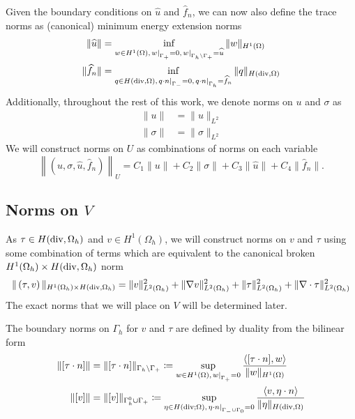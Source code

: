 \documentclass[11pt,onecolumn]{scrartcl}
\newcommand{\grad}{\nabla}
\renewcommand{\div}{\grad \cdot}
\begin{document}
Given the boundary conditions on $\widehat{u}$ and $\widehat{f}_n$, we can now also define the trace norms as (canonical) minimum energy extension norms 
\begin{align*}
\|\widehat{u}\| &= \inf_{w\in H^1(\Omega), \left.w\right|_{\Gamma_+}=0, \left.w\right |_{\Gamma_h\setminus \Gamma_+ } = \widehat{u}} \|w\|_{H^1(\Omega)}\\
\|\widehat{f}_n\| &= \inf_{q\in H({\rm div},\Omega), \left.q\cdot n\right|_{\Gamma_-}= 0, \left. q\cdot n \right |_{\Gamma_h} = \widehat{f}_n} \|q\|_{H({\rm div},\Omega)}
\end{align*}
Additionally, throughout the rest of this work, we denote norms on $u$ and $\sigma$ as
\begin{align*}
\|u\| &= \|u\|_{L^2} \\
\|\sigma\| &= \|\sigma\|_{L^2}
\end{align*}
We will construct norms on $U$ as combinations of norms on each variable
\[
\left\|\left(u,\sigma,\widehat{u},\widehat{f}_n\right)\right\|_U = C_1 \|u\| + C_2 \|\sigma\| + C_3 \|\widehat{u}\| + C_4 \|\widehat{f}_n\|.
\]
\subsection{Norms on $V$}

As $\tau \in H({\rm div},\Omega_h)$ and $v \in H^1(\Omega_h)$, we will construct norms on $v$ and $\tau$ using some combination of terms which are equivalent to the canonical broken $H^1(\Omega_h) \times H({\rm div},\Omega_h)$ norm 
\[
\|\left(\tau,v\right)\|_{H^1(\Omega_h) \times H({\rm div},\Omega_h)} = \|v\|_{L^2(\Omega_h)}^2 + \|\grad v\|_{L^2(\Omega_h)}^2  + \|\tau\|_{L^2(\Omega_h)}^2 + \|\div \tau\|_{L^2(\Omega_h)}^2
\]
The exact norms that we will place on $V$ will be determined later. 

The boundary norms on $\Gamma_h$ for $v$ and $\tau$ are defined by duality from the bilinear form
\begin{align*}
\|[\tau\cdot n]\| &= \|[\tau\cdot n]\|_{\Gamma_h \setminus \Gamma_+} \coloneqq \sup_{w\in H^1(\Omega), \left.w\right|_{\Gamma_+} = 0} \frac{\langle [\tau \cdot n], w\rangle}{\|w\|_{H^1(\Omega)}}\\
\|[v]\|&=\|[v]\|_{\Gamma_h^0 \cup \Gamma_+} \coloneqq \sup_{\eta\in H({\rm div};\Omega), \left.\eta\cdot n\right|_{\Gamma_- \cup \Gamma_0} = 0} \frac{\langle v, \eta\cdot n\rangle}{\|\eta\|_{H({\rm div},\Omega)}}
\end{align*}
\end{document}
